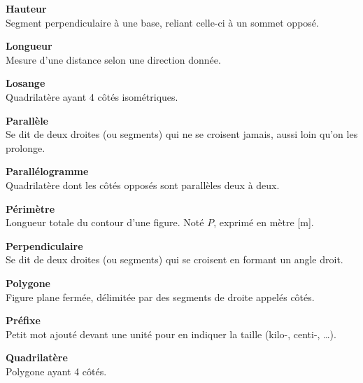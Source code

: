 \begin{tcbraster}[raster columns=2, raster equal height, raster valign=top,raster column skip=2mm, raster row skip=2mm]
\begin{terme}
\end{terme}
\begin{terme}
\textbf{\large Hauteur}\\[2pt]
{\small Segment perpendiculaire à une base, reliant celle-ci à un sommet opposé.}
\end{terme}
\begin{terme}
\textbf{\large Longueur}\\[2pt]
{\small Mesure d'une distance selon une direction donnée.}
\end{terme}
\begin{terme}
\textbf{\large Losange}\\[2pt]
{\small Quadrilatère ayant 4 côtés isométriques.}
\end{terme}
\begin{terme}
\textbf{\large Parallèle}\\[2pt]
{\small Se dit de deux droites (ou segments) qui ne se croisent jamais, aussi loin qu'on les prolonge.}
\end{terme}
\begin{terme}
\textbf{\large Parallélogramme}\\[2pt]
{\small Quadrilatère dont les côtés opposés sont parallèles deux à deux.}
\end{terme}
\begin{terme}
\textbf{\large Périmètre}\\[2pt]
{\small Longueur totale du contour d'une figure. Noté $P$, exprimé en mètre [m].}
\end{terme}
\begin{terme}
\textbf{\large Perpendiculaire}\\[2pt]
{\small Se dit de deux droites (ou segments) qui se croisent en formant un angle droit.}
\end{terme}
\begin{terme}
\textbf{\large Polygone}\\[2pt]
{\small Figure plane fermée, délimitée par des segments de droite appelés côtés.}
\end{terme}
\begin{terme}
\textbf{\large Préfixe}\\[2pt]
{\small Petit mot ajouté devant une unité pour en indiquer la taille (kilo-, centi-, \ldots).}
\end{terme}
\begin{terme}
\textbf{\large Quadrilatère}\\[2pt]
{\small Polygone ayant 4 côtés.}
\end{terme}
\begin{terme}

\end{terme}
\end{tcbraster}
